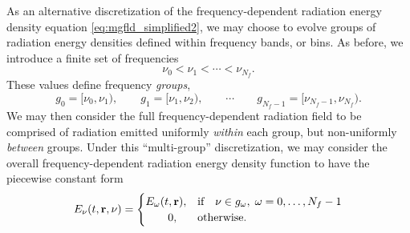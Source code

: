 \documentclass[10pt]{article}
\renewcommand{\(}{\left(}
\renewcommand{\)}{\right)}
\newcommand{\rvec}{{\bf r}}
\newcommand{\Enu}{E_{\nu}}
\begin{document}
As an alternative discretization of the frequency-dependent radiation
energy density equation \eqref{eq:mgfld_simplified2}, we may choose to
evolve groups of radiation energy densities defined within frequency
bands, or bins.  As before, we introduce a finite set of frequencies
\begin{equation}
\label{eq:bin_bounds}
  \nu_0 < \nu_1 < \cdots < \nu_{N_f}.
\end{equation}
These values define frequency {\em groups}, 
\begin{equation}
\label{eq:frequency_groups}
  g_0 = [\nu_0,\nu_1), \qquad   g_1 = [\nu_1,\nu_2), 
  \qquad \cdots \qquad
  g_{N_f-1} = [\nu_{N_f-1},\nu_{N_f}).
\end{equation}
We may then consider the full frequency-dependent radiation field to
be comprised of radiation emitted uniformly {\em within} each group,
but non-uniformly {\em between} groups.  Under this ``multi-group''
discretization, we may consider the overall frequency-dependent
radiation energy density function to have the piecewise constant form  
\begin{equation}
\label{eq:multigroup_radiation}
  \Enu(t,\rvec,\nu) = \begin{cases}
    E_{\omega}(t,\rvec), & \text{if}\quad \nu \in g_{\omega}, \; \omega=0,\ldots,N_f-1\\
    \qquad 0, & \text{otherwise}.
  \end{cases}
\end{equation}
\end{document}
